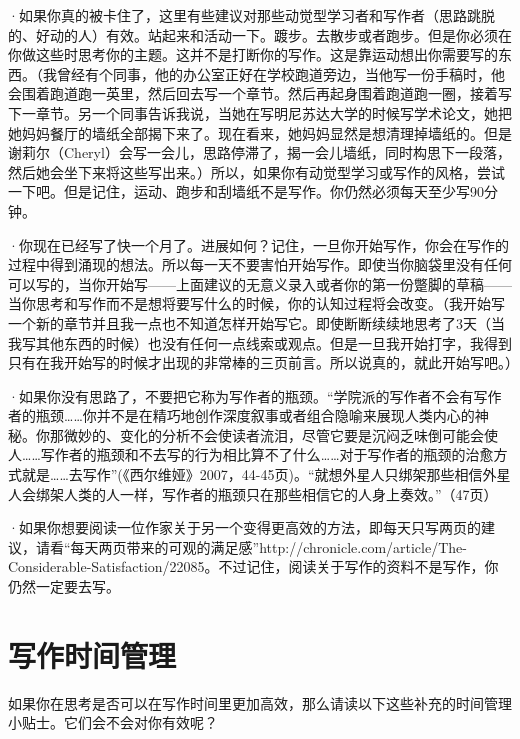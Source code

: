 \documentclass[12pt]{ctexart}
\begin{document}
·如果你真的被卡住了，这里有些建议对那些动觉型学习者和写作者（思路跳脱的、好动的人）有效。站起来和活动一下。踱步。去散步或者跑步。但是你必须在你做这些时思考你的主题。这并不是打断你的写作。这是靠运动想出你需要写的东西。（我曾经有个同事，他的办公室正好在学校跑道旁边，当他写一份手稿时，他会围着跑道跑一英里，然后回去写一个章节。然后再起身围着跑道跑一圈，接着写下一章节。另一个同事告诉我说，当她在写明尼苏达大学的时候写学术论文，她把她妈妈餐厅的墙纸全部揭下来了。现在看来，她妈妈显然是想清理掉墙纸的。但是谢莉尔（Cheryl）会写一会儿，思路停滞了，揭一会儿墙纸，同时构思下一段落，然后她会坐下来将这些写出来。）所以，如果你有动觉型学习或写作的风格，尝试一下吧。但是记住，运动、跑步和刮墙纸不是写作。你仍然必须每天至少写90分钟。

·你现在已经写了快一个月了。进展如何？记住，一旦你开始写作，你会在写作的过程中得到涌现的想法。所以每一天不要害怕开始写作。即使当你脑袋里没有任何可以写的，当你开始写——上面建议的无意义录入或者你的第一份蹩脚的草稿——当你思考和写作而不是想将要写什么的时候，你的认知过程将会改变。（我开始写一个新的章节并且我一点也不知道怎样开始写它。即使断断续续地思考了3天（当我写其他东西的时候）也没有任何一点线索或观点。但是一旦我开始打字，我得到只有在我开始写的时候才出现的非常棒的三页前言。所以说真的，就此开始写吧。）

·如果你没有思路了，不要把它称为写作者的瓶颈。“学院派的写作者不会有写作者的瓶颈……你并不是在精巧地创作深度叙事或者组合隐喻来展现人类内心的神秘。你那微妙的、变化的分析不会使读者流泪，尽管它要是沉闷乏味倒可能会使人……写作者的瓶颈和不去写的行为相比算不了什么……对于写作者的瓶颈的治愈方式就是……去写作”(《西尔维娅》2007，44-45页)。“就想外星人只绑架那些相信外星人会绑架人类的人一样，写作者的瓶颈只在那些相信它的人身上奏效。”（47页）

·如果你想要阅读一位作家关于另一个变得更高效的方法，即每天只写两页的建议，请看“每天两页带来的可观的满足感”http://chronicle.com/article/The-Considerable-Satisfaction/22085。不过记住，阅读关于写作的资料不是写作，你仍然一定要去写。

\section{写作时间管理}
如果你在思考是否可以在写作时间里更加高效，那么请读以下这些补充的时间管理小贴士。它们会不会对你有效呢？
\end{document}
